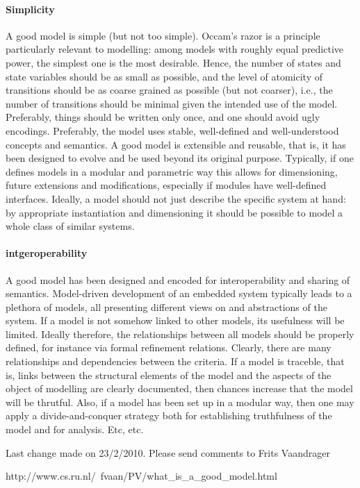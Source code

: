 \paragraph{Simplicity}
A good model is simple (but not too simple). Occam's razor is a principle particularly relevant to modelling: among models with roughly equal predictive power, the simplest one is the most desirable. Hence, the number of states and state variables should be as small as possible, and the level of atomicity of transitions should be as coarse grained as possible (but not coarser), i.e., the number of transitions should be minimal given the intended use of the model. Preferably, things should be written only once, and one should avoid ugly encodings. Preferably, the model uses stable, well-defined and well-understood concepts and semantics.
A good model is extensible and reusable, that is, it has been designed to evolve and be used beyond its original purpose. Typically, if one defines models in a modular and parametric way this allows for dimensioning, future extensions and modifications, especially if modules have well-defined interfaces. Ideally, a model should not just describe the specific system at hand: by appropriate instantiation and dimensioning it should be possible to model a whole class of similar systems.
\paragraph{intgeroperability}
A good model has been designed and encoded for interoperability and sharing of semantics. Model-driven development of an embedded system typically leads to a plethora of models, all presenting different views on and abstractions of the system. If a model is not somehow linked to other models, its usefulness will be limited. Ideally therefore, the relationships between all models should be properly defined, for instance via formal refinement relations.
Clearly, there are many relationships and dependencies between the criteria. If a model is traceble, that is, links between the structural elements of the model and the aspects of the object of modelling are clearly documented, then chances increase that the model will be thrutful. Also, if a model has been set up in a modular way, then one may apply a divide-and-conquer strategy both for establishing truthfulness of the model and for analysis. Etc, etc.

Last change made on 23/2/2010. Please send comments to Frits Vaandrager


http://www.cs.ru.nl/~fvaan/PV/what_is_a_good_model.html


